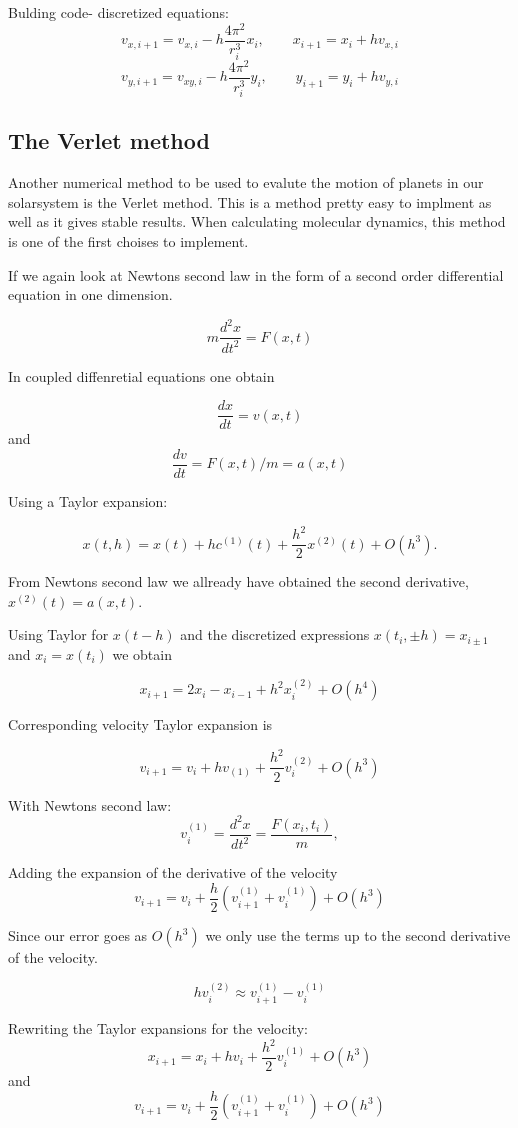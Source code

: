 \documentclass[../main.tex]{subfiles}
\begin{document}
Bulding code- discretized equations:
$$v_{x,i+1} = v_{x,i} - h \frac{4\pi^2}{r_i^3}x_i,\qquad x_{i+1} = x_{i} + hv_{x,i}$$
$$v_{y,i+1} = v_{xy,i} - h \frac{4\pi^2}{r_i^3}y_i,\qquad y_{i+1} = y_{i} + hv_{y,i}$$

\subsection{The Verlet method}
Another numerical method to be used to evalute the motion of planets in our solarsystem is the Verlet method. This is a method pretty easy to implment as well as it gives stable results. When calculating molecular dynamics, this method is one of the first choises to implement.

If we again look at Newtons second law in the form of a second order differential equation in one dimension.


 $$m \frac{d^2x}{dt^2} = F(x,t)$$


In coupled diffenretial equations one obtain

$$\frac{dx}{dt} = v(x,t)$$    and     $$\frac{dv}{dt} = F(x,t)/m = a(x,t)$$

Using a Taylor expansion:

 $$x(t,h) = x(t) + hc^{(1)}(t) + \frac{h^2}{2}x^{(2)}(t) + O(h^3).$$


From Newtons second law we allready have obtained the second derivative, $x^{(2)}(t) = a(x,t)$.

Using Taylor for $x(t-h)$ and the discretized expressions $x(t_i,\pm h) = x_{i \pm 1}$ and $x_i = x(t_i)$ we obtain

$$x_{i+1} = 2x_i - x_{i-1} + h^2 x_i^{(2)} + O(h^4)$$

Corresponding velocity Taylor expansion is

$$v_{i+1} = v_i + hv_{(1)} + \frac{h^2}{2} v_i^{(2)} + O(h^3)$$

With Newtons second law:
$$v_i^{(1)} = \frac{d^2x}{dt^2} = \frac{F(x_i, t_i)}{m},$$

Adding the expansion of the derivative of the velocity
$$v_{i+1} = v_i + \frac{h}{2}\left(v_{i+1}^{(1)} + v_i^{(1)}\right) + O(h^3)$$

Since our error goes as $O(h^3)$ we only use the terms up to the second derivative of the velocity.

$$hv_i^{(2)}\approx v_{i+1}^{(1)} - v_i^{(1)}$$

Rewriting the Taylor expansions for the velocity:
$$x_{i+1} = x_i + hv_i + \frac{h^2}{2} v_i^{(1)} + O(h^3)$$
and
$$v_{i+1} = v_i + \frac{h}{2} \left(v_{i+1}^{(1)} + v_i^{(1)}\right) + O(h^3)$$
\end{document}
